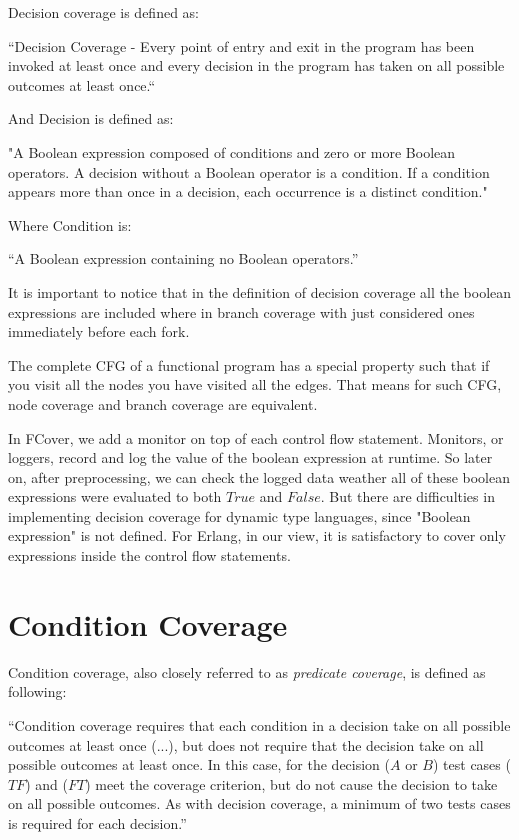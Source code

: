 \documentclass[12pt,a4paper]{report}
\begin{document}
Decision coverage is defined as:

“Decision Coverage - Every point of entry and exit in the program has been invoked at least once and every decision in the program has taken on all possible outcomes at least once.“\cite{cast-10}

And Decision is defined as:

"A Boolean expression composed of conditions and zero or more Boolean operators. A decision without a Boolean operator is a condition. If a condition appears more than once in a decision, each occurrence is a distinct condition."\cite{cast-10}

Where Condition is:

“A Boolean expression containing no Boolean operators.”\cite{cast-10}

It is important to notice that in the definition of decision coverage all the boolean expressions are included where in branch coverage with just considered ones immediately before each fork.

The complete CFG of a functional program has a special property such that if you visit all the nodes you have visited all the edges. That means for such CFG, node coverage and branch coverage are equivalent.

In FCover, we add a monitor on top of each control flow statement. Monitors, or loggers, record and log the value of the boolean expression at runtime. So later on, after preprocessing, we can check the logged data weather all of these boolean expressions were evaluated to both $True$ and $False$. But there are difficulties in implementing decision coverage for dynamic type languages, since "Boolean expression" is not defined. For Erlang, in our view, it is satisfactory to cover only expressions inside the control flow statements.

 
\section{Condition Coverage}
Condition coverage, also closely referred to as \emph{predicate coverage}, is defined as following:

“Condition coverage requires that each condition in a decision take on all possible outcomes at least once (...), but does not require that the decision take on all possible outcomes at least once. In this case, for the decision ($A$ or $B$) test cases ($TF$) and ($FT$) meet the coverage criterion, but do not cause the decision to take on all possible outcomes. As with decision coverage, a minimum of two tests cases is required for each decision.”\cite{KellyJ.:2001:PTM:886632}
\end{document}
